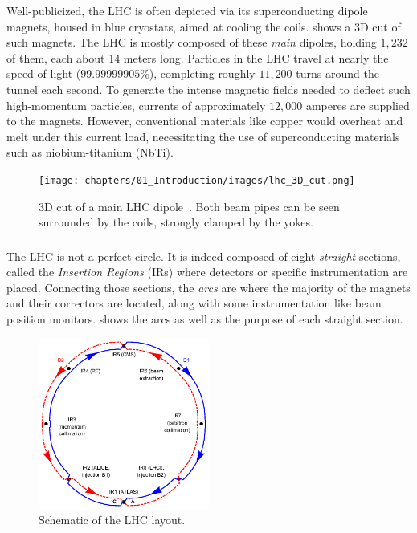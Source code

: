 Well-publicized, the LHC is often depicted via its superconducting dipole magnets, housed in blue
cryostats, aimed at cooling the coils.  shows a 3D cut of such magnets. The
LHC is mostly composed of these \textit{main} dipoles, holding $1,232$ of them, each about 14 meters
long. 
Particles in the LHC travel at nearly the speed of light ($99.99999905\%$), completing roughly
$11,200$ turns around the tunnel each second. To generate the intense magnetic fields needed to
deflect such high-momentum particles, currents of approximately $12,000$ amperes are supplied to the
magnets.  However, conventional materials like copper would overheat and melt under this current
load, necessitating the use of superconducting materials such as niobium-titanium (NbTi).


\begin{figure}[!htb]
    \centering
    \texttt{[image: chapters/01\_Introduction/images/lhc\_3D\_cut.png]}
    \caption{3D cut of a main LHC dipole~\cite{noauthor_cern_nodate}. Both beam pipes can be seen
    surrounded by the coils, strongly clamped by the yokes.}
    \label{fig:3d_cut_dipole}
\end{figure}


\subsubsection{}

The LHC is not a perfect circle. It is indeed composed of eight \textit{straight} sections, called
the \textit{Insertion Regions} (IRs) where detectors or specific instrumentation are placed.
Connecting those sections, the \textit{arcs} are where the majority of the magnets and their
correctors are located, along with some instrumentation like beam position monitors.
 shows the arcs as well as the purpose of each straight section.

\begin{figure}[!htb]
    \centering
    \includegraphics[width=0.5\textwidth]{./images/irs.png}
    \caption{Schematic of the LHC layout.}
    \label{fig:introduction:lhc_irs}
\end{figure}


